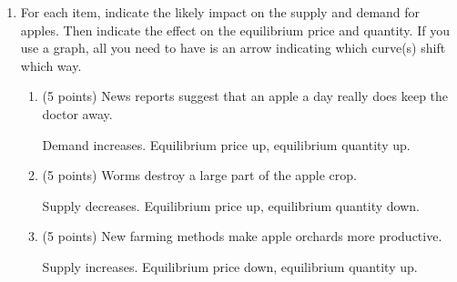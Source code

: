 \documentclass{article}
\newcommand{\mybigskip}{\vspace{1in}}
\begin{document}
\begin{enumerate}












\item \begin{EXAM} For each item, indicate the likely impact on the supply and demand for apples. Then indicate the effect on the equilibrium price and quantity. If you use a graph, all you need to have is an arrow indicating which curve(s) shift which way. \end{EXAM}

    \begin{enumerate}

    \item \begin{EXAM} (5 points) News reports suggest that an apple a day really does keep the doctor away. \mybigskip \end{EXAM}

\begin{KEY} Demand increases. Equilibrium price up, equilibrium quantity up.\end{KEY}


    \item \begin{EXAM} (5 points) Worms destroy a large part of the apple crop. \mybigskip \end{EXAM}

\begin{KEY} Supply decreases. Equilibrium price up, equilibrium quantity down.\end{KEY}


    \item \begin{EXAM} (5 points) New farming methods make apple orchards more productive. \mybigskip \end{EXAM}

\begin{KEY} Supply increases. Equilibrium price down, equilibrium quantity up.\end{KEY}




\end{enumerate}
\end{enumerate}
\end{document}
